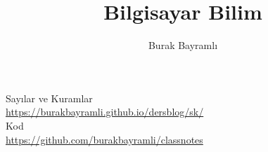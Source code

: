 \documentclass[12pt,a4paper]{report}
\title{Bilgisayar Bilim}
\author{Burak Bayramlı}
\date{}
\begin{document}
\maketitle

\newpage

\vspace*{4cm}
\begin{center}
\vspace{0.5cm}
Sayılar ve Kuramlar\\
\vspace{0.5cm}
\url{https://burakbayramli.github.io/dersblog/sk/}\\
\vspace{0.5cm}
Kod\\
\vspace{0.5cm}
\url{https://github.com/burakbayramli/classnotes}\\
\end{center}
\end{document}
